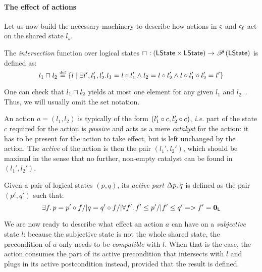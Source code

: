 \paragraph{The effect of actions} Let us now build the necessary
machinery to describe how actions in $\varsigma_{}$ and $\varsigma_{\ell}$ act
on the shared state $l_s$.

\begin{definition}[Intersection]
The \emph{intersection} function over logical states 
$
\sqcap_{} : \left(\textsf{LState} \times \textsf{LState} \right) \rightarrow \mathscr{P}\left(\textsf{LState} \right)
$
is defined as:
\[
l_1 \sqcap_{} l_2 \mathrel{\stackrel{\smash{\scriptscriptstyle{\mathrm{def}}}}{=}} 
\left\{ 
l  \mid
\exists l', l_1', l_2'.\,\! l_1 = l \circ l_1' \land l_2 = l \circ l_2' \land l \circ l_1' \circ l_2' = l'
\right\}
\]
\end{definition}

One can check that $l_1\sqcap_{} l_2$ yields at most one element for any
given $l_1$ and $l_2$~\cite{colosl-tr14}. Thus, we will usually omit
the set notation.

An action $a = (l_1, l_2)$ is typically of the form $(l_1'\circ c,
l_2'\circ c)$, \textit{i.e.} part of the state $c$ required for
the action is \emph{passive} and acts as a mere \emph{catalyst} for
the action: it has to be present for the action to take effect, but is
left unchanged by the action. The \emph{active} of the action is then
the pair $(l_1',l_2')$, which should be maximal in the sense that no
further, non-empty catalyst can be found in $(l_1',l_2')$.

\begin{definition}
  Given a pair of logical states $(p, q)$, its \emph{active part}
  $\Delta {p,q}$ is defined as the pair $(p', q')$ such that:
  \[
  \exists f.\, p = p' \circ f /| q = q' \circ f /| \forall f'.\, f'\leq p' /|
  f'\leq q' => f' = \mathbf{0}_{\textsf{L}}
  \]
\end{definition}

We are now ready to describe what effect an action $a$ can have on a
\emph{subjective} state $l$: because the subjective state is not the
whole shared state, the precondition of $a$ only needs to be
\emph{compatible} with $l$. When that is the case, the action consumes
the part of its active precondition that intersects with $l$ and plugs
in its active postcondition instead, provided that the result is
defined.

